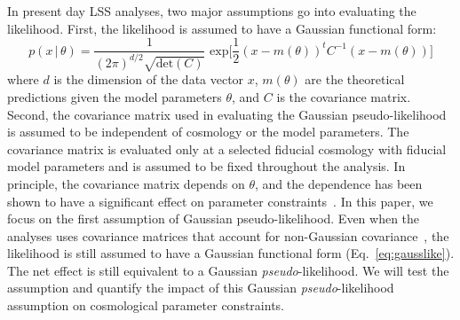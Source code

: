\documentclass[12pt, letterpaper, preprint]{aastex}
\newcommand{\beq}{\begin{equation}}
\newcommand{\eeq}{\end{equation}}
\newcommand{\lss}{{\small{LSS}}\xspace}
\begin{document}
In present day \lss analyses, two major assumptions go into evaluating the 
likelihood. First, the likelihood is assumed to have a Gaussian functional 
form: 
\beq \label{eq:gausslike}
p(x\,|\,\theta) = \frac{1}{(2\pi)^{d/2} \sqrt{\mathrm{det}(C)}}\,\,\mathrm{exp}\bigg[\frac{1}{2}(x - m(\theta))^{t} C^{-1} (x - m(\theta))\bigg]
\eeq
where $d$ is the dimension of the data vector $x$, $m(\theta)$ are the
theoretical predictions given the model parameters $\theta$, and $C$ 
is the covariance matrix. Second, the covariance matrix used in evaluating the Gaussian pseudo-likelihood
is assumed to be independent of cosmology or the model parameters.
The covariance matrix is evaluated only at a selected fiducial cosmology with  
fiducial model parameters and is assumed to be fixed throughout  
the analysis. In principle, the covariance matrix depends on $\theta$, 
and the dependence has been shown to have a significant effect 
on parameter constraints~\citep[\emph{e.g.}][]{eifler2009, morrison2013, white2015}. 
In this paper, we focus on the first assumption of Gaussian pseudo-likelihood. 
Even when the analyses uses covariance matrices that account for non-Gaussian 
covariance~\citep[\emph{e.g.}][]{scoccimarro1999, hu2001, oconnell2016}, 
the likelihood is still assumed to have a Gaussian functional form
(Eq.~\ref{eq:gausslike}). The net effect is still equivalent to a Gaussian \emph{pseudo}-likelihood. 
We will test the assumption and quantify the impact of this Gaussian
\emph{pseudo}-likelihood assumption on cosmological parameter constraints. 
\end{document}
